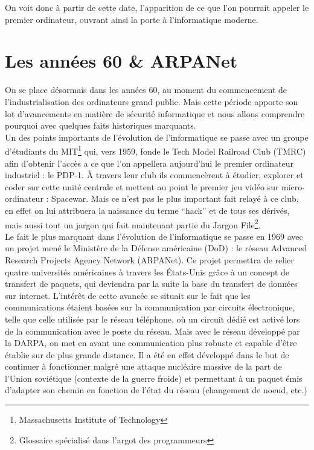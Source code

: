 \documentclass[a4paper]{memoir}
\begin{document}
On voit donc à partir de cette date, l'apparition de ce que l'on pourrait appeler le premier ordinateur, ouvrant ainsi la porte à l'informatique moderne.

\section{Les années 60 \& ARPANet}

On se place désormais dans les années 60, au moment du commencement de l'industrialisation des ordinateurs grand public. Mais cette période apporte son lot d'avancements en matière de sécurité informatique et nous allons comprendre pourquoi avec quelques faits historiques marquants.\\

Un des points importants de l'évolution de l'informatique se passe avec un groupe d'étudiants du MIT\footnote{Massachusetts Institute of Technology} qui, vers 1959, fonde le Tech Model Railroad Club (TMRC) afin d'obtenir l'accès a ce que l'on appellera aujourd'hui le premier ordinateur industriel : le PDP-1. À travers leur club ils commencèrent à étudier, explorer et coder sur cette unité centrale et mettent au point le premier jeu vidéo sur micro-ordinateur : Spacewar. Mais ce n'est pas le plus important fait relayé à ce club, en effet on lui attribuera la naissance du terme ``hack'' et de tous ses dérivés, mais aussi tout un jargon qui fait maintenant partie du Jargon File\footnote{Glossaire spécialisé dans l'argot des programmeurs}.\\

Le fait le plus marquant dans l'évolution de l'informatique se passe en 1969 avec un projet mené le Ministère de la Défense américaine (DoD) : le réseau Advanced Research Projects Agency Network (ARPANet). Ce projet permettra de relier quatre universités américaines à travers les États-Unis grâce à un concept de transfert de paquets, qui deviendra par la suite la base du transfert de données sur internet. L'intérêt de cette avancée se situait sur le fait que les communications étaient basées sur la communication par circuits électronique, telle que celle utilisée par le réseau téléphone, où un circuit dédié est activé lors de la communication avec le poste du réseau. Mais avec le réseau développé par la DARPA, on met en avant une communication plus robuste et capable d'être établie sur de plus grande distance. Il a été en effet développé dans le but de continuer à fonctionner malgré une attaque nucléaire massive de la part de l'Union soviétique (contexte de la guerre froide) et permettant à un paquet émis d'adapter son chemin en fonction de l'état du réseau (changement de noeud, etc.)
\end{document}
